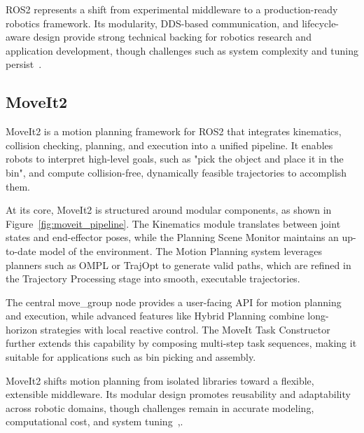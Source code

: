 \documentclass[12pt]{extarticle}
\begin{document}
ROS2 represents a shift from experimental middleware to a production-ready robotics framework. Its modularity, DDS-based communication, and lifecycle-aware design provide strong technical backing for robotics research and application development, though challenges such as system complexity and tuning persist~\cite{ros2-doc}.

\subsection{MoveIt2}

MoveIt2 is a motion planning framework for ROS2 that integrates kinematics, collision checking, planning, and execution into a unified pipeline. It enables robots to interpret high-level goals, such as "pick the object and place it in the bin", and compute collision-free, dynamically feasible trajectories to accomplish them.

At its core, MoveIt2 is structured around modular components, as shown in Figure~\ref{fig:moveit_pipeline}. The Kinematics module translates between joint states and end-effector poses, while the Planning Scene Monitor maintains an up-to-date model of the environment. The Motion Planning system leverages planners such as OMPL or TrajOpt to generate valid paths, which are refined in the Trajectory Processing stage into smooth, executable trajectories.

The central move\_group node provides a user-facing API for motion planning and execution, while advanced features like Hybrid Planning combine long-horizon strategies with local reactive control. The MoveIt Task Constructor further extends this capability by composing multi-step task sequences, making it suitable for applications such as bin picking and assembly.

MoveIt2 shifts motion planning from isolated libraries toward a flexible, extensible middleware. Its modular design promotes reusability and adaptability across robotic domains, though challenges remain in accurate modeling, computational cost, and system tuning~\cite{moveit-doc},\cite{moveit2}.
\end{document}
